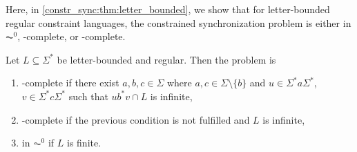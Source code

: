 
Here, in \cref{constr_sync:thm:letter_bounded}, we show that for letter-bounded
regular constraint languages, the constrained synchronization problem 
is either in $\AC^0$, \LOGSPACE-complete, or \NP-complete.


\begin{theorem}
	\label{constr_sync:thm:letter_bounded}
	Let $L \subseteq \Sigma^*$ be letter-bounded and regular.
	Then the problem 
	is
	\begin{enumerate}
		\item \label{constr_sync:thm:letter_bounded:NPc} \NP-complete if there exist $a,b,c \in \Sigma$ where $a,c \in \Sigma \setminus \{b\}$ and $u \in \Sigma^* a \Sigma^*$,
		$v \in \Sigma^* c \Sigma^*$ such that $ub^*v \cap L$ is infinite,
		
		\item \LOGSPACE-complete %
		if the previous condition is not fulfilled and $L$ is infinite,
		
		\item in $\AC^0$ if $L$ is finite.
	\end{enumerate}
\end{theorem}
